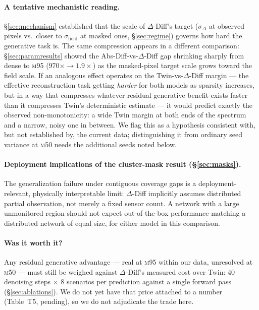 \documentclass[11pt]{article}
\newcommand{\ours}{\mbox{$\Delta$-Diff}}       %
\newcommand{\absdiff}{\mbox{Abs-Diff}}          %
\newcommand{\twin}{\mbox{Twin}}                 %
\newcommand{\mfifty}{\textsc{m50}}
\newcommand{\mninetyfive}{\textsc{m95}}
\begin{document}
\paragraph{A tentative mechanistic reading.} \S\ref{sec:mechanism}
established that the scale of \ours{}'s target ($\sigma_\Delta$ at
observed pixels vs.\ closer to $\sigma_{\text{field}}$ at masked ones,
\S\ref{sec:regime}) governs how hard the generative task is. The same
compression appears in a different comparison: \S\ref{sec:paramresults}
showed the \absdiff{}-vs-\ours{} gap shrinking sharply from dense to
\mninetyfive{} ($970\times \to 1.9\times$) as the masked-pixel target
scale grows toward the field scale. If an analogous effect operates on
the \twin{}-vs-\ours{} margin --- the effective reconstruction task
getting \emph{harder} for both models as sparsity increases, but in a way
that compresses whatever residual generative benefit exists faster than
it compresses \twin{}'s deterministic estimate --- it would predict
exactly the observed non-monotonicity: a wide \twin{} margin at both ends
of the spectrum and a narrow, noisy one in between. We flag this as a
hypothesis consistent with, but not established by, the current data;
distinguishing it from ordinary seed variance at \mfifty{} needs the
additional seeds noted below.

\paragraph{Deployment implications of the cluster-mask result
(\S\ref{sec:masks}).} The generalization failure under contiguous
coverage gaps is a deployment-relevant, physically interpretable limit:
\ours{} implicitly assumes distributed partial observation, not merely a
fixed sensor count. A network with a large unmonitored region should not
expect out-of-the-box performance matching a distributed network of equal
size, for either model in this comparison.

\paragraph{Was it worth it?} Any residual generative advantage --- real
at \mninetyfive{} within our data, unresolved at \mfifty{} --- must still
be weighed against \ours{}'s measured cost over \twin{}: 40 denoising
steps $\times$ 8 scenarios per prediction against a single forward pass
(\S\ref{sec:ablations}). We do not yet have that price attached to a
number (Table~T5, pending), so we do not adjudicate the trade here.
\end{document}
